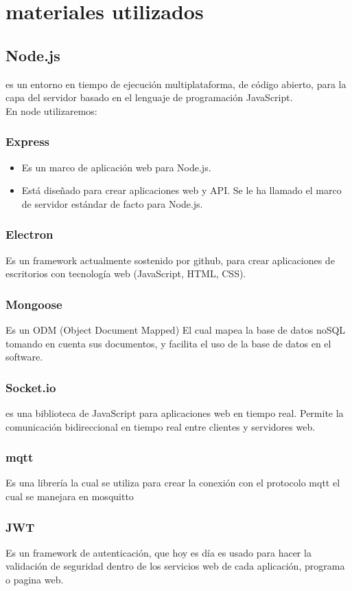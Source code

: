 \section{materiales utilizados}
\subsection{Node.js}
es un entorno en tiempo de ejecución multiplataforma, de código abierto, para la capa del servidor basado en el lenguaje de programación JavaScript.\\
En node utilizaremos:
\subsubsection{Express}
\begin{itemize}
\item Es un marco de aplicación web para Node.js.
\item Está diseñado para crear aplicaciones web y API. Se le ha llamado el marco de servidor estándar de facto para Node.js.
\end{itemize}
\subsubsection{Electron}
Es un framework actualmente sostenido por github, para crear aplicaciones de escritorios con tecnología web (JavaScript, HTML, CSS).
\subsubsection{Mongoose}
Es un ODM (Object Document Mapped) El cual mapea la base de datos noSQL  tomando en cuenta sus documentos, y facilita el uso de la base de datos en el software.
\subsubsection{Socket.io}
es una biblioteca de JavaScript para aplicaciones web en tiempo real. Permite la comunicación bidireccional en tiempo real entre clientes y servidores web. 
\subsubsection{mqtt}
Es una librería la cual se utiliza para crear la conexión con el protocolo mqtt el cual se manejara en mosquitto
\subsubsection{JWT}
Es un framework de autenticación, que hoy es día es usado para hacer la validación de seguridad dentro de los servicios web de cada aplicación, programa o pagina web.
